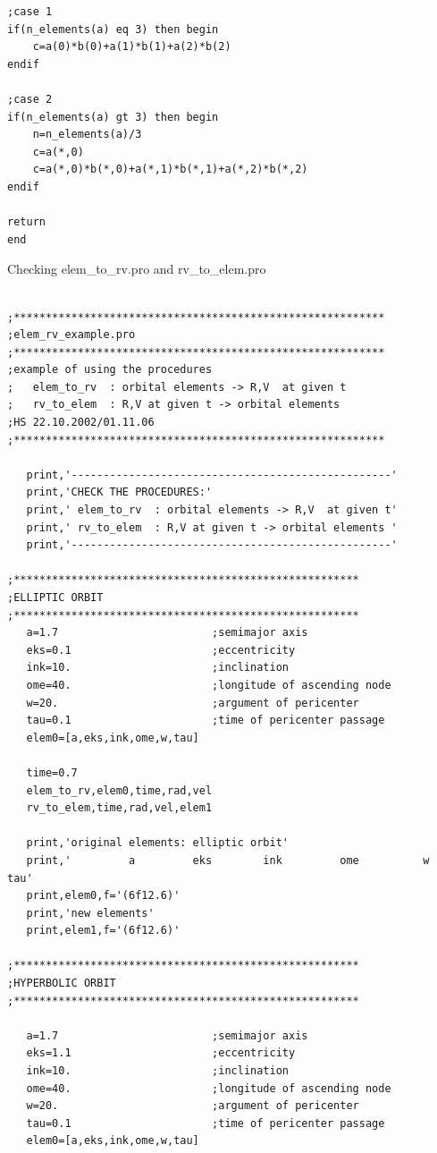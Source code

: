 \documentclass[a4paper,12pt]{article}
\def\red{\color{red}}
\def\black{\color{RGBblack}}
\begin{document}
{{{{\begin{verbatim}
;case 1
if(n_elements(a) eq 3) then begin
    c=a(0)*b(0)+a(1)*b(1)+a(2)*b(2)
endif

;case 2
if(n_elements(a) gt 3) then begin
    n=n_elements(a)/3
    c=a(*,0)
    c=a(*,0)*b(*,0)+a(*,1)*b(*,1)+a(*,2)*b(*,2)
endif

return
end

\end{verbatim}
\black}

\newpage

{\isob Checking elem\_to\_rv.pro  and  rv\_to\_elem.pro }


{\red \scriptsize
\begin{verbatim}

;**********************************************************
;elem_rv_example.pro
;**********************************************************
;example of using the procedures
;   elem_to_rv  : orbital elements -> R,V  at given t
;   rv_to_elem  : R,V at given t -> orbital elements
;HS 22.10.2002/01.11.06
;**********************************************************

   print,'--------------------------------------------------'
   print,'CHECK THE PROCEDURES:'
   print,' elem_to_rv  : orbital elements -> R,V  at given t'
   print,' rv_to_elem  : R,V at given t -> orbital elements '
   print,'--------------------------------------------------'

;******************************************************
;ELLIPTIC ORBIT
;******************************************************
   a=1.7                        ;semimajor axis
   eks=0.1                      ;eccentricity
   ink=10.                      ;inclination
   ome=40.                      ;longitude of ascending node
   w=20.                        ;argument of pericenter
   tau=0.1                      ;time of pericenter passage 
   elem0=[a,eks,ink,ome,w,tau]

   time=0.7
   elem_to_rv,elem0,time,rad,vel
   rv_to_elem,time,rad,vel,elem1

   print,'original elements: elliptic orbit'
   print,'         a         eks        ink         ome          w         tau'
   print,elem0,f='(6f12.6)'
   print,'new elements'
   print,elem1,f='(6f12.6)'
      
;******************************************************
;HYPERBOLIC ORBIT
;******************************************************

   a=1.7                        ;semimajor axis
   eks=1.1                      ;eccentricity
   ink=10.                      ;inclination
   ome=40.                      ;longitude of ascending node
   w=20.                        ;argument of pericenter
   tau=0.1                      ;time of pericenter passage 
   elem0=[a,eks,ink,ome,w,tau]


\end{verbatim}}}}}
\end{document}
